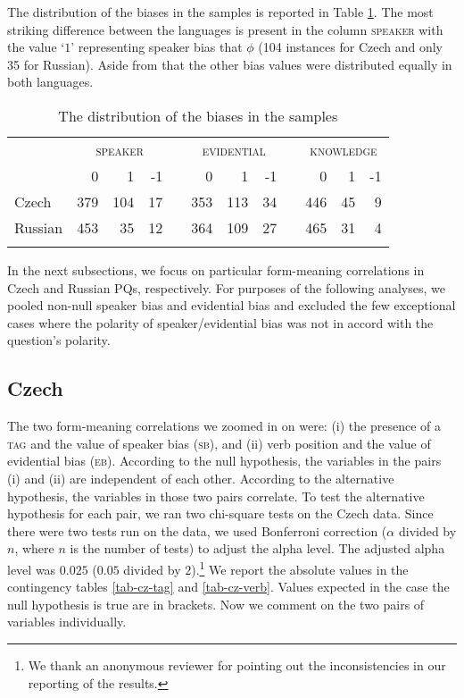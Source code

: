 \documentclass[output=paper,colorlinks,citecolor=brown]{langscibook}
\begin{document}
The distribution of the biases in the samples is reported in Table \ref{tab-semprag-numbers}. The most striking difference between the languages is present in the column \textsc{speaker} with the value `$1$' representing speaker bias that $\phi$ (104 instances for Czech and only 35 for Russian). Aside from that the other bias values were distributed equally in both languages. 

\begin{table}
\caption{The distribution of the biases in the samples}
\label{tab-semprag-numbers}
 \begin{tabularx}{.8\textwidth}{lrrr @{}X@{} rrr @{}X@{} rrr} %
 \lsptoprule
            & \multicolumn{3}{c}{\small{\textsc{speaker}}} && \multicolumn{3}{c}{\small{\textsc{evidential}}}  && \multicolumn{3}{c}{\small{\textsc{knowledge}}} \\

            \cmidrule(lr){2-4}\cmidrule(lr){6-8}\cmidrule(lr){10-12}
            & \small{\textsc{0}} & \small{\textsc{1}} & \small{\textsc{-1}}& & \small{\textsc{0}} & \small{\textsc{1}} & \small{\textsc{-1}}& & \small{\textsc{0}} & \small{\textsc{1}} & \small{\textsc{-1}} \\
 \midrule
  Czech    &   379  & 104  & 17 & &  353  & 113  & 34 & & 446  & 45  & 9 \\
  Russian  &   453  & 35   & 12 & & 364   & 109  & 27 & & 465  & 31  & 4 \\
  \lspbottomrule
 \end{tabularx}
\end{table}

In the next subsections, we focus on particular form-meaning correlations in Czech and Russian PQs, respectively. For purposes of the following analyses, we pooled non-null speaker bias and evidential bias and excluded the few exceptional cases where the polarity of speaker/evidential bias was not in accord with the question's polarity.

\subsection{Czech}
The two form-meaning correlations we zoomed in on were: (i) the presence of a \textsc{tag} and the value of speaker bias (\textsc{sb}), and (ii) verb position and the value of evidential bias (\textsc{eb}). According to the null hypothesis, the variables in the pairs (i) and (ii) are independent of each other. According to the alternative hypothesis, the variables in those two pairs correlate. To test the alternative hypothesis for each pair, we ran two chi-square tests on the Czech data. Since there were two tests run on the data, we used Bonferroni correction ($\alpha$ divided by $n$, where $n$ is the number of tests) to adjust the alpha level. The adjusted alpha level was $0.025$ ($0.05$ divided by $2$).\footnote{We thank an anonymous reviewer for pointing out the inconsistencies in our reporting of the results.} We report the absolute values in the contingency tables \ref{tab-cz-tag} and \ref{tab-cz-verb}. Values expected in the case the null hypothesis is true are in brackets. Now we comment on the two pairs of variables individually.
\end{document}
